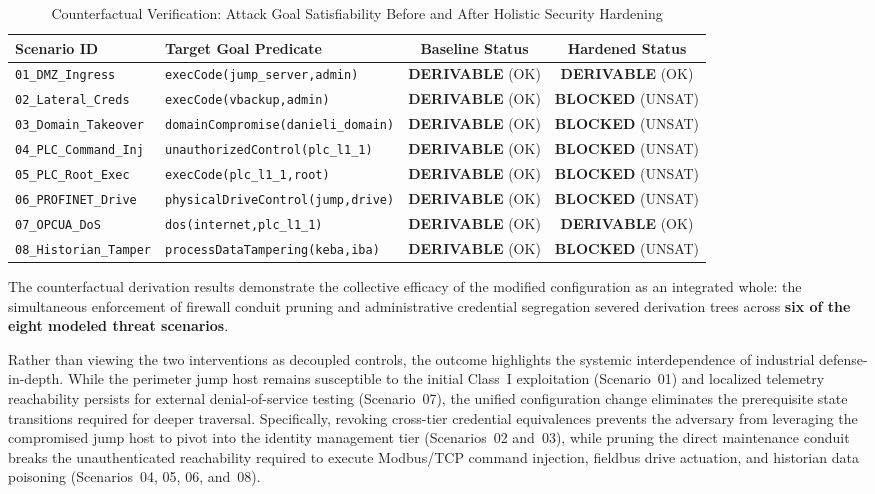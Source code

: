 \documentclass[target=mst,aauheader=aics,style=]{thud}
\begin{document}
\begin{table}[htbp]
\centering
\small
\caption{Counterfactual Verification: Attack Goal Satisfiability Before and After Holistic Security Hardening}
\label{tab:counterfactual_results}
\begin{tabularx}{\textwidth}{L{2.8cm}Ycc}
\toprule
\textbf{Scenario ID} & \textbf{Target Goal Predicate} & \textbf{Baseline Status} & \textbf{Hardened Status} \\
\midrule
\texttt{01\_DMZ\_Ingress} & \texttt{execCode(jump\_server,admin)} & \textbf{DERIVABLE} (OK) & \textbf{DERIVABLE} (OK) \\
\texttt{02\_Lateral\_Creds} & \texttt{execCode(vbackup,admin)} & \textbf{DERIVABLE} (OK) & \textbf{BLOCKED} (UNSAT) \\
\texttt{03\_Domain\_Takeover} & \texttt{domainCompromise(danieli\_domain)} & \textbf{DERIVABLE} (OK) & \textbf{BLOCKED} (UNSAT) \\
\texttt{04\_PLC\_Command\_Inj} & \texttt{unauthorizedControl(plc\_l1\_1)} & \textbf{DERIVABLE} (OK) & \textbf{BLOCKED} (UNSAT) \\
\texttt{05\_PLC\_Root\_Exec} & \texttt{execCode(plc\_l1\_1,root)} & \textbf{DERIVABLE} (OK) & \textbf{BLOCKED} (UNSAT) \\
\texttt{06\_PROFINET\_Drive} & \texttt{physicalDriveControl(jump,drive)} & \textbf{DERIVABLE} (OK) & \textbf{BLOCKED} (UNSAT) \\
\texttt{07\_OPCUA\_DoS} & \texttt{dos(internet,plc\_l1\_1)} & \textbf{DERIVABLE} (OK) & \textbf{DERIVABLE} (OK) \\
\texttt{08\_Historian\_Tamper} & \texttt{processDataTampering(keba,iba)} & \textbf{DERIVABLE} (OK) & \textbf{BLOCKED} (UNSAT) \\
\bottomrule
\end{tabularx}
\end{table}

The counterfactual derivation results demonstrate the collective efficacy of the modified configuration as an integrated whole: the simultaneous enforcement of firewall conduit pruning and administrative credential segregation severed derivation trees across \textbf{six of the eight modeled threat scenarios}. 

Rather than viewing the two interventions as decoupled controls, the outcome highlights the systemic interdependence of industrial defense-in-depth. While the perimeter jump host remains susceptible to the initial Class~I exploitation (Scenario~01) and localized telemetry reachability persists for external denial-of-service testing (Scenario~07), the unified configuration change eliminates the prerequisite state transitions required for deeper traversal. Specifically, revoking cross-tier credential equivalences prevents the adversary from leveraging the compromised jump host to pivot into the identity management tier (Scenarios~02 and~03), while pruning the direct maintenance conduit breaks the unauthenticated reachability required to execute Modbus/TCP command injection, fieldbus drive actuation, and historian data poisoning (Scenarios~04, 05, 06, and~08). 
\end{document}
